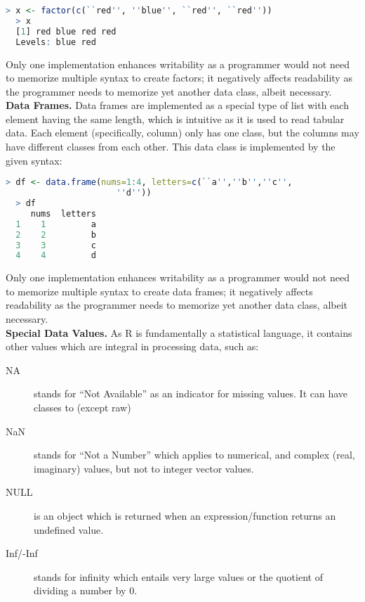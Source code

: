 \documentclass[12pt]{article}
\begin{document}
\begin{lstlisting}[language=R, frame=none]
  > x <- factor(c(``red'', ''blue'', ``red'', ``red''))
  > x
  [1] red blue red red
  Levels: blue red
\end{lstlisting}

Only one implementation enhances writability as a programmer would not need to memorize multiple syntax to create factors; it negatively affects readability as the programmer needs to memorize yet another data class, albeit necessary.\\

\textbf{Data Frames.} Data frames are implemented as a special type of list with each element having the same length, which is intuitive as it is used to read tabular data. Each element (specifically, column) only has one class, but the columns may have different classes from each other. This data class is implemented by the given syntax:

\begin{lstlisting}[language=R, frame=none]
  > df <- data.frame(nums=1:4, letters=c(``a'',''b'',''c'',
                      ''d''))
  > df
     nums  letters
  1    1         a
  2    2         b
  3    3         c
  4    4         d
\end{lstlisting}

Only one implementation enhances writability as a programmer would not need to memorize multiple syntax to create data frames; it negatively affects readability as the programmer needs to memorize yet another data class, albeit necessary.\\

\textbf{Special Data Values.} As R is fundamentally a statistical language, it contains other values which are integral in processing data, such as:
\begin{description}
\item[NA] stands for ``Not Available'' as an indicator for missing values. It can have classes to (except raw)
\item[NaN] stands for ``Not a Number'' which applies to numerical, and complex (real, imaginary) values, but not to integer vector values.
\item[NULL] is an object which is returned when an expression/function returns an undefined value.
\item[Inf/-Inf] stands for infinity which entails very large values or the quotient of dividing a number by 0.
\end{description}
\end{document}
